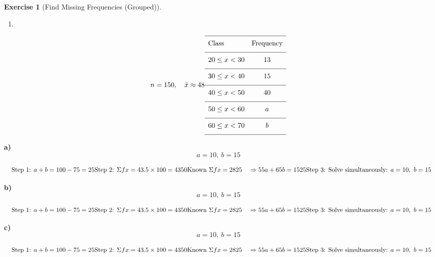 \documentclass[
  letterpaper,
  DIV=11,
  numbers=noendperiod]{scrreprt}
\providecommand{\tightlist}{%
  \setlength{\itemsep}{0pt}\setlength{\parskip}{0pt}}
\theoremstyle{definition}
\newtheorem{exercise}{Exercise}[chapter]
\theoremstyle{remark}
\begin{document}
\begin{exercise}[Find Missing Frequencies
(Grouped)]
\begin{enumerate}
\def\labelenumi{\alph{enumi})}
\setcounter{enumi}{3}
\tightlist
\item
\end{enumerate}

\[n = 150,\quad \bar{x} \approx 48\\[6pt]{\renewcommand{\arraystretch}{1.6}\begin{array}{lc}
\hline \text{Class} & \text{Frequency} \\[4pt]
\hline 20 \leq x < 30 & 13 \\[4pt]
\hline 30 \leq x < 40 & 15 \\[4pt]
\hline 40 \leq x < 50 & 40 \\[4pt]
\hline 50 \leq x < 60 & a \\[4pt]
\hline 60 \leq x < 70 & b \\[4pt]
\hline \end{array}}\]

\begin{tcolorbox}[enhanced jigsaw, opacitybacktitle=0.6, coltitle=black, arc=.35mm, colframe=quarto-callout-tip-color-frame, colback=white, bottomrule=.15mm, left=2mm, colbacktitle=quarto-callout-tip-color!10!white, titlerule=0mm, opacityback=0, title=\textcolor{quarto-callout-tip-color}{\faLightbulb}\hspace{0.5em}{🔍 View Solution}, leftrule=.75mm, breakable, rightrule=.15mm, bottomtitle=1mm, toptitle=1mm, toprule=.15mm]

\textbf{a)} \[a = 10,\ b = 15\]

\[\quad \text{Step 1: }a+b=100-75=25\\[4pt]\text{Step 2: }\Sigma fx=43.5\times100=4350\\[4pt]\text{Known }\Sigma fx=2825\quad\Rightarrow 55a+65b=1525\\[4pt]\text{Step 3: Solve simultaneously: }a=10,\ b=15\]

\textbf{b)} \[a = 10,\ b = 15\]

\[\quad \text{Step 1: }a+b=100-75=25\\[4pt]\text{Step 2: }\Sigma fx=43.5\times100=4350\\[4pt]\text{Known }\Sigma fx=2825\quad\Rightarrow 55a+65b=1525\\[4pt]\text{Step 3: Solve simultaneously: }a=10,\ b=15\]

\textbf{c)} \[a = 10,\ b = 15\]

\[\quad \text{Step 1: }a+b=100-75=25\\[4pt]\text{Step 2: }\Sigma fx=43.5\times100=4350\\[4pt]\text{Known }\Sigma fx=2825\quad\Rightarrow 55a+65b=1525\\[4pt]\text{Step 3: Solve simultaneously: }a=10,\ b=15\]


\end{tcolorbox}
\end{exercise}
\end{document}
